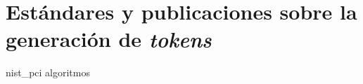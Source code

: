 %
%
%

\chapter{Estándares y publicaciones sobre la generación de \textit{tokens}}

{nist_pci}
{algoritmos}
